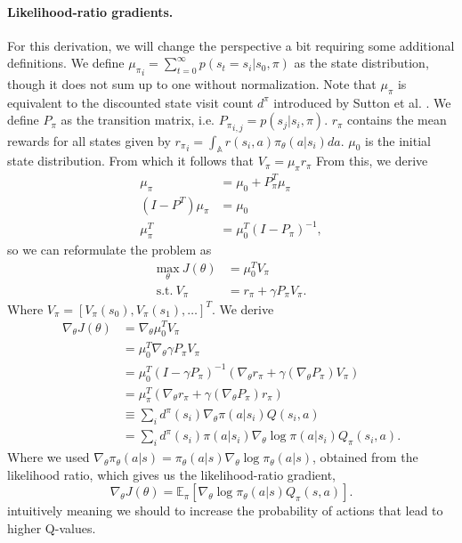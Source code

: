 \paragraph{Likelihood-ratio gradients.} 
For this derivation, we will change the perspective a bit requiring some additional definitions. 
We define ${\mu_\pi}_i = \sum_{t=0}^{\infty} p(s_t=s_i | s_0, \pi)$ \cite{puterman2014markov} as the state distribution, though it does not sum up to one without normalization. Note that $\mu_\pi$ is equivalent to the discounted state visit count $d^\pi$ introduced by Sutton et al. \cite{Sutton:1999:PGM:3009657.3009806}.
We define $P_\pi$ as the transition matrix, i.e. ${P_\pi}_{i,j}=p(s_j|s_i,\pi)$.
$r_\pi$ contains the mean rewards for all states given by ${r_\pi}_i = \int_\mathbb{A} r(s_i,a)\pi_\theta(a|s_i) da$. 
$\mu_0$ is the initial state distribution.
From which it follows that $V_\pi = \mu_\pi r_\pi$
From this, we derive
\begin{align}
	\mu_\pi &= \mu_0 + P_\pi^T \mu_\pi \nonumber \\
	(I-P^T)\mu_\pi &= \mu_0 \nonumber \\
	\mu_\pi^T &= \mu_0^T (I-P_\pi)^{-1} ,
\end{align}
so we can reformulate the problem as 
\begin{align}
	\underset{\theta}{\text{max}}\ J(\theta) &= \mu_0^T V_\pi \\
	\text{s.t.}\ V_\pi &= r_\pi + \gamma P_\pi V_\pi . \nonumber
\end{align}
Where $V_\pi = \left[ V_\pi(s_0), V_\pi(s_1), \ldots \right]^T$. We derive 
\begin{align*}
	\nabla_\theta J(\theta) &= \nabla_\theta \mu_0^T V_\pi
	\\ &= \mu_0^T \nabla_\theta \gamma P_\pi V_\pi
	\\ &= \mu_0^T (I - \gamma P_\pi)^{-1} (\nabla_\theta r_\pi + \gamma (\nabla_\theta P_\pi) V_\pi)
	\\ &= \mu_\pi^T (\nabla_\theta r_\pi + \gamma (\nabla_\theta P_\pi) r_\pi)
	\\ &\equiv \sum\nolimits_i d^\pi(s_i) \nabla_\theta\pi(a|s_i) Q(s_i,a)
	\\ &= \sum\nolimits_i d^\pi(s_i) \pi(a|s_i) \nabla_\theta\log\pi(a|s_i) Q_\pi(s_i,a).
\end{align*}
Where we used $\nabla_\theta \pi_\theta(a|s) = \pi_\theta(a|s)\nabla_\theta\log\pi_\theta(a|s)$, obtained from the likelihood ratio, which gives us the likelihood-ratio gradient,
\begin{equation}
	\nabla_\theta J(\theta) = \mathbb{E}_{\pi}\left[\nabla_\theta{\log\pi_\theta(a|s)}Q_\pi(s,a)\right].
	\label{eqn:like-grad}
\end{equation}
intuitively meaning we should to increase the probability of actions that lead to higher Q-values.

